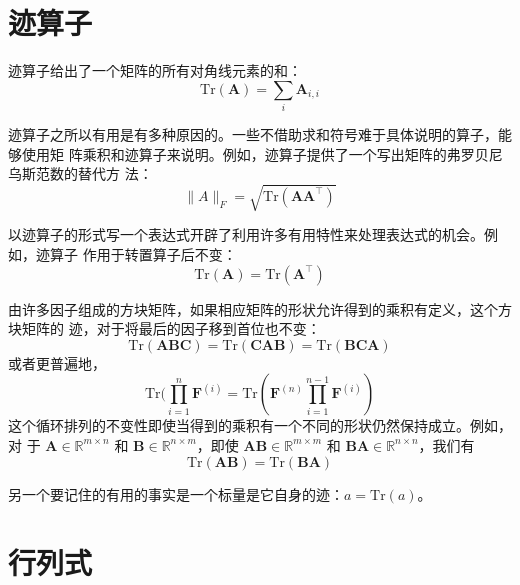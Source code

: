 \section{迹算子}
\label{sec:the_trace_operator}

迹算子给出了一个矩阵的所有对角线元素的和：
\begin{equation}
  \mathrm{Tr}(\pmb{A}) = \sum_i\pmb{A}_{i,i}
\end{equation}

迹算子之所以有用是有多种原因的。一些不借助求和符号难于具体说明的算子，能够使用矩
阵乘积和迹算子来说明。例如，迹算子提供了一个写出矩阵的弗罗贝尼乌斯范数的替代方
法：
\begin{equation}
  \|A\|_F = \sqrt{\mathrm{Tr}(\pmb{A}\pmb{A}^{\top})}
  \label{eq:trace_operator_of_frobenius_norm}
\end{equation}

以迹算子的形式写一个表达式开辟了利用许多有用特性来处理表达式的机会。例如，迹算子
作用于转置算子后不变：
\begin{equation}
  \mathrm{Tr}(\pmb{A}) = \mathrm{Tr}(\pmb{A}^{\top})
\end{equation}

由许多因子组成的方块矩阵，如果相应矩阵的形状允许得到的乘积有定义，这个方块矩阵的
迹，对于将最后的因子移到首位也不变：
\begin{equation}
  \mathrm{Tr}(\pmb{A}\pmb{B}\pmb{C}) = \mathrm{Tr}(\pmb{C}\pmb{A}\pmb{B}) =
  \mathrm{Tr}(\pmb{B}\pmb{C}\pmb{A})
\end{equation}
或者更普遍地，
\begin{equation}
  \mathrm{Tr}(\prod^n_{i=1}\pmb{F}^{(i)} =
  \mathrm{Tr}(\pmb{F}^{(n)}\prod^{n-1}_{i=1}\pmb{F}^{(i)})
  \label{eq:trace_of_square_matrix}
\end{equation}
这个循环排列的不变性即使当得到的乘积有一个不同的形状仍然保持成立。例如，对
于 $\pmb{A} \in \mathbb{R}^{m \times n}$ 和
$\pmb{B} \in \mathbb{R}^{n \times m}$，即使
$\pmb{A}\pmb{B} \in \mathbb{R}^{m \times m}$ 和
$\pmb{B}\pmb{A} \in \mathbb{R}^{n \times n}$，我们有
\begin{equation}
  \mathrm{Tr}(\pmb{A}\pmb{B}) = \mathrm{Tr}(\pmb{B}\pmb{A})
\end{equation}

另一个要记住的有用的事实是一个标量是它自身的迹：$a = \mathrm{Tr}(a)$。

\section{行列式}
\label{sec:the_determinant}

